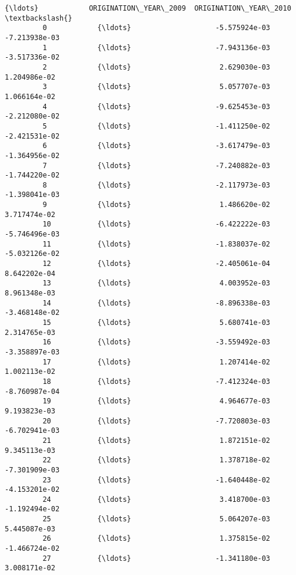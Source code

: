 \documentclass[11pt]{article}
\begin{document}
\begin{Verbatim}[commandchars=\\\{\}]
                      {\ldots}            ORIGINATION\_YEAR\_2009  ORIGINATION\_YEAR\_2010  \textbackslash{}
         0            {\ldots}                    -5.575924e-03          -7.213938e-03   
         1            {\ldots}                    -7.943136e-03          -3.517336e-02   
         2            {\ldots}                     2.629030e-03           1.204986e-02   
         3            {\ldots}                     5.057707e-03           1.066164e-02   
         4            {\ldots}                    -9.625453e-03          -2.212080e-02   
         5            {\ldots}                    -1.411250e-02          -2.421531e-02   
         6            {\ldots}                    -3.617479e-03          -1.364956e-02   
         7            {\ldots}                    -7.240882e-03          -1.744220e-02   
         8            {\ldots}                    -2.117973e-03          -1.398041e-03   
         9            {\ldots}                     1.486620e-02           3.717474e-02   
         10           {\ldots}                    -6.422222e-03          -5.746496e-03   
         11           {\ldots}                    -1.838037e-02          -5.032126e-02   
         12           {\ldots}                    -2.405061e-04           8.642202e-04   
         13           {\ldots}                     4.003952e-03           8.961348e-03   
         14           {\ldots}                    -8.896338e-03          -3.468148e-02   
         15           {\ldots}                     5.680741e-03           2.314765e-03   
         16           {\ldots}                    -3.559492e-03          -3.358897e-03   
         17           {\ldots}                     1.207414e-02           1.002113e-02   
         18           {\ldots}                    -7.412324e-03          -8.760987e-04   
         19           {\ldots}                     4.964677e-03           9.193823e-03   
         20           {\ldots}                    -7.720803e-03          -6.702941e-03   
         21           {\ldots}                     1.872151e-02           9.345113e-03   
         22           {\ldots}                     1.378718e-02          -7.301909e-03   
         23           {\ldots}                    -1.640448e-02          -4.153201e-02   
         24           {\ldots}                     3.418700e-03          -1.192494e-02   
         25           {\ldots}                     5.064207e-03           5.445087e-03   
         26           {\ldots}                     1.375815e-02          -1.466724e-02   
         27           {\ldots}                    -1.341180e-03           3.008171e-02   

\end{Verbatim}
\end{document}
